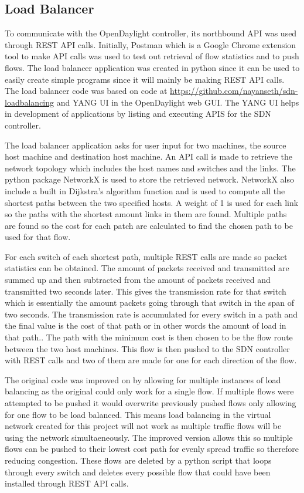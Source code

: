 \subsection{Load Balancer}
To communicate with the OpenDaylight controller, its northbound API was used through REST API calls. Initially, Postman which is a Google Chrome extension tool to make API calls was used to test out retrieval of flow statistics and to push flows. The load balancer application was created in python since it can be used to easily create simple programs since it will mainly be making REST API calls. The load balancer code was based on code at \url{https://github.com/nayanseth/sdn-loadbalancing} and YANG UI in the OpenDaylight web GUI. The YANG UI helps in development of applications by listing and executing APIS for the SDN controller.
\newline
\par
The load balancer application asks for user input for two machines, the source host machine and destination host machine. An API call is made to retrieve the network topology which includes the host names and switches and the links. The python package NetworkX is used to store the retrieved network. NetworkX also include a built in Dijkstra's algorithm function and is used to compute all the shortest paths between the two specified hosts. A weight of 1 is used for each link so the paths with the shortest amount links in them are found. Multiple paths are found so the cost for each patch are calculated to find the chosen path to be used for that flow.
\newline
\par
For each switch of each shortest path, multiple REST calls are made so packet statistics can be obtained. The amount of packets received and transmitted are summed up and then subtracted from the amount of packets received and transmitted two seconds later. This gives the transmission rate for that switch which is essentially the amount packets going through that switch in the span of two seconds. The transmission rate is accumulated for every switch in a path and the final value is the cost of that path or in other words the amount of load in that path.. The path with the minimum cost is then chosen to be the flow route between the two host machines. This flow is then pushed to the SDN controller with REST calls and two of them are made for one for each direction of the flow.
\newline
\par
The original code was improved on by allowing for multiple instances of load balancing as the original could only work for a single flow. If multiple flows were attempted to be pushed it would overwrite previously pushed flows only allowing for one flow to be load balanced. This means load balancing in the virtual network created for this project will not work as multiple traffic flows will be using the network simultaeneously. The improved version allows this so multiple flows can be pushed to their lowest cost path for evenly spread traffic so therefore reducing congestion. These flows are deleted by a python script that loops through every switch and deletes every possible flow that could have been installed through REST API calls.

